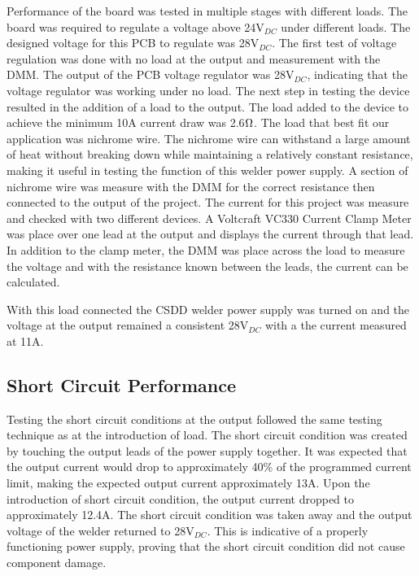 \documentclass[11pt]{article}
\begin{document}
       Performance of the board was tested in multiple stages with different loads. The board was required to regulate a voltage above 24V$_{DC}$ under different loads. The designed voltage for this PCB to regulate was 28V$_{DC}$. The first test of voltage regulation was done with no load at the output and measurement with the DMM. The output of the PCB voltage regulator was 28V$_{DC}$, indicating that the voltage regulator was working under no load. The next step in testing the device resulted in the addition of a load to the output. 
       The load added to the device to achieve the minimum 10A current draw was 2.6$\ohm$. The load that best fit our application was nichrome wire. The nichrome wire can withstand a large amount of heat without breaking down while maintaining a relatively constant resistance, making it useful in testing the function of this welder power supply. A section of nichrome wire was measure with the DMM for the correct resistance then connected to the output of the project. The current for this project was measure and checked with two different devices. A Voltcraft VC330 Current Clamp Meter was place over one lead at the output and displays the current through that lead. In addition to the clamp meter, the DMM was place across the load to measure the voltage and with the resistance known between the leads, the current can be calculated. 
       
       With this load connected the CSDD welder power supply was turned on and the voltage at the output remained a consistent 28V$_{DC}$ with a the current measured at 11A. 
        
    \subsection{Short Circuit Performance}
        Testing the short circuit conditions at the output followed the same testing technique as at the introduction of load. The short circuit condition was created by touching the output leads of the power supply together. It was expected that the output current would drop to approximately 40\% of the programmed current limit, making the expected output current approximately 13A. Upon the introduction of short circuit condition, the output current dropped to approximately 12.4A. The short circuit condition was taken away and the output voltage of the welder returned to 28V$_{DC}$. This is indicative of a properly functioning power supply, proving that the short circuit condition did not cause component damage.
        
\end{document}
